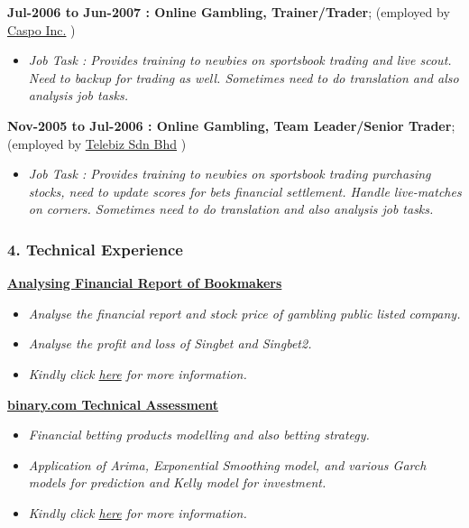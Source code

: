 \documentclass[]{article}
\providecommand{\tightlist}{%
  \setlength{\itemsep}{0pt}\setlength{\parskip}{0pt}}
\begin{document}
\textbf{Jul-2006 to Jun-2007 : Online Gambling, Trainer/Trader};
(employed by
\href{http://www.callcenterbeat.com/caspo-philippines/}{Caspo Inc.} )

\begin{itemize}
\tightlist
\item
  \emph{Job Task : Provides training to newbies on sportsbook trading
  and live scout. Need to backup for trading as well. Sometimes need to
  do translation and also analysis job tasks.}
\end{itemize}

\textbf{Nov-2005 to Jul-2006 : Online Gambling, Team Leader/Senior
Trader}; (employed by \href{http://www.telebizness.com/}{Telebiz Sdn
Bhd} )

\begin{itemize}
\tightlist
\item
  \emph{Job Task : Provides training to newbies on sportsbook trading
  purchasing stocks, need to update scores for bets financial
  settlement. Handle live-matches on corners. Sometimes need to do
  translation and also analysis job tasks.}
\end{itemize}

\subsubsection{4. Technical Experience}\label{technical-experience}

\href{https://github.com/scibrokes/analyse-the-finance-and-stocks-price-of-bookmakers}{\textbf{Analysing
Financial Report of Bookmakers}}

\begin{itemize}
\tightlist
\item
  \emph{Analyse the financial report and stock price of gambling public
  listed company.}
\item
  \emph{Analyse the profit and loss of Singbet and Singbet2.}
\item
  \emph{Kindly click
  \href{https://github.com/scibrokes/analyse-the-finance-and-stocks-price-of-bookmakers}{here}
  for more information.}
\end{itemize}

\href{https://github.com/englianhu/binary.com-interview-question}{\textbf{binary.com
Technical Assessment}}

\begin{itemize}
\tightlist
\item
  \emph{Financial betting products modelling and also betting strategy.}
\item
  \emph{Application of Arima, Exponential Smoothing model, and various
  Garch models for prediction and Kelly model for investment.}
\item
  \emph{Kindly click
  \href{https://github.com/englianhu/binary.com-interview-question}{here}
  for more information.}
\end{itemize}
\end{document}
